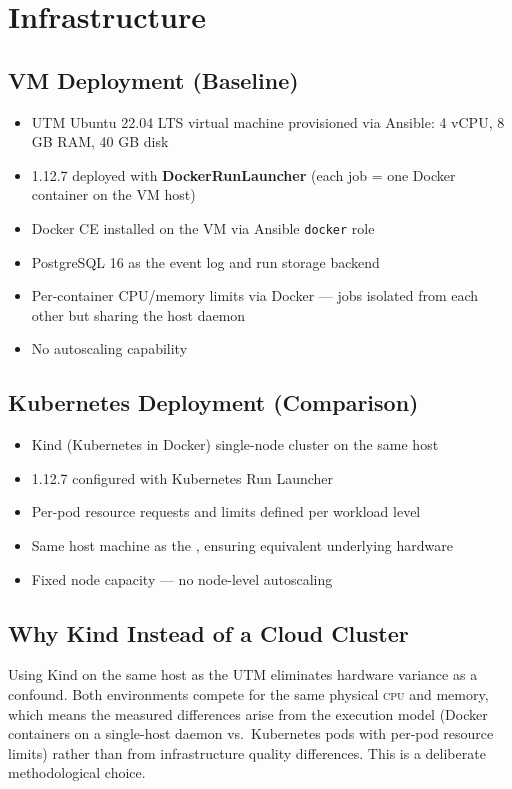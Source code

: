\section{Infrastructure}

\subsection{VM Deployment (Baseline)}

\begin{itemize}
  \item UTM Ubuntu 22.04 LTS virtual machine provisioned via Ansible: 4 vCPU, 8 GB RAM, 40 GB disk
  \item \dagster{} 1.12.7 deployed with \textbf{DockerRunLauncher} (each job = one Docker container on the VM host)
  \item Docker CE installed on the VM via Ansible \texttt{docker} role
  \item PostgreSQL 16 as the \dagster{} event log and run storage backend
  \item Per-container CPU/memory limits via Docker --- jobs isolated from each other but sharing the host daemon
  \item No autoscaling capability
\end{itemize}

\subsection{Kubernetes Deployment (Comparison)}

\begin{itemize}
  \item Kind (Kubernetes in Docker) single-node cluster on the same host
  \item \dagster{} 1.12.7 configured with Kubernetes Run Launcher
  \item Per-pod resource requests and limits defined per workload level
  \item Same host machine as the \vm{}, ensuring equivalent underlying hardware
  \item Fixed node capacity --- no node-level autoscaling
\end{itemize}

\subsection{Why Kind Instead of a Cloud Cluster}

Using Kind on the same host as the UTM \vm{} eliminates hardware variance as a
confound. Both environments compete for the same physical \textsc{cpu} and memory, which
means the measured differences arise from the execution model (Docker containers on a
single-host daemon vs.\ Kubernetes pods with per-pod resource limits) rather than from
infrastructure quality differences. This is a deliberate methodological choice.

